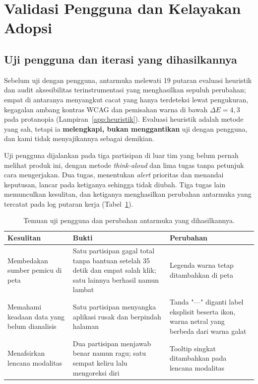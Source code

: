 
\section{Validasi Pengguna dan Kelayakan Adopsi}

\subsection{Uji pengguna dan iterasi yang dihasilkannya}

Sebelum uji dengan pengguna, antarmuka melewati 19 putaran evaluasi heuristik
\cite{nielsen1990} dan audit aksesibilitas terinstrumentasi yang menghasilkan
sepuluh perubahan; empat di antaranya menyangkut cacat yang hanya terdeteksi
lewat pengukuran, kegagalan ambang kontras WCAG dan pemisahan warna di bawah
$\Delta E = 4{,}3$ pada protanopia (Lampiran~\ref{app:heuristik}). Evaluasi
heuristik adalah metode yang sah, tetapi ia \textbf{melengkapi, bukan
menggantikan} uji dengan pengguna, dan kami tidak menyajikannya sebagai
demikian.

Uji pengguna dijalankan pada tiga partisipan di luar tim yang belum pernah
melihat produk ini, dengan metode \emph{think-aloud} dan lima tugas tanpa
petunjuk cara mengerjakan. Dua tugas, menentukan \emph{alert} prioritas dan
menandai keputusan, lancar pada ketiganya sehingga tidak diubah. Tiga tugas
lain memunculkan kesulitan, dan ketiganya menghasilkan perubahan antarmuka yang
tercatat pada log putaran kerja (Tabel~\ref{tab:iterasi}).

\begin{table}[!htbp]
\caption{Temuan uji pengguna dan perubahan antarmuka yang dihasilkannya.}
\label{tab:iterasi}
\centering
\small
\begin{tabular}{p{2.9cm}p{4.2cm}p{4.6cm}}
\hline
\textbf{Kesulitan} & \textbf{Bukti} & \textbf{Perubahan} \\
\hline
Membedakan sumber pemicu di peta &
Satu partisipan gagal total tanpa bantuan setelah 35 detik dan empat salah
klik; satu lainnya berhasil namun lambat &
Legenda warna tetap ditambahkan di peta \\
Memahami keadaan data yang belum dianalisis &
Satu partisipan menyangka aplikasi rusak dan berpindah halaman &
Tanda "---" diganti label eksplisit beserta ikon, warna netral yang berbeda
dari warna galat \\
Menafsirkan lencana modalitas &
Dua partisipan menjawab benar namun ragu; satu sempat keliru lalu mengoreksi
diri &
Tooltip singkat ditambahkan pada lencana modalitas \\
\hline
\end{tabular}
\end{table}

